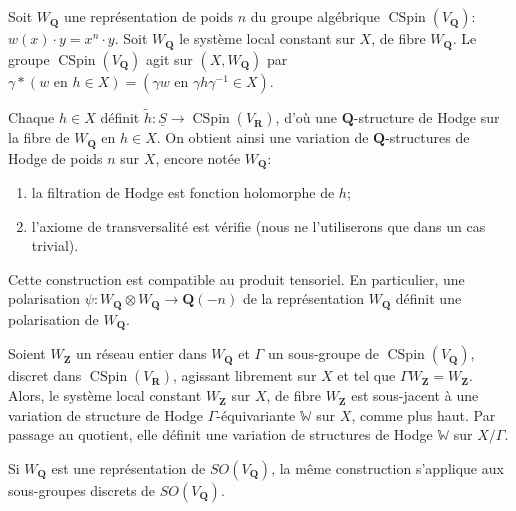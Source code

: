 \documentclass[11pt]{amsart}
\theoremstyle{plain}
\theoremstyle{definition}
\theoremstyle{remark}
\begin{document}
\subsection*{}
Soit $W_\mathbf{Q}$ une repr\'esentation de poids $n$ du groupe alg\'ebrique $\operatorname{CSpin}(V_\mathbf{Q})$: $w(x)\cdot y=x^n\cdot y$. Soit $W_\mathbf{Q}$ le syst\`eme local constant sur $X$, de fibre $W_\mathbf{Q}$. Le groupe $\operatorname{CSpin}(V_\mathbf{Q})$ agit sur $(X,W_\mathbf{Q})$ par $\gamma*(w\text{ en }h\in X)=(\gamma w\text{ en }\gamma h\gamma^{-1}\in X)$.

Chaque $h\in X$ d\'efinit $\tilde{h}\colon\underline{S}\to\operatorname{CSpin}(V_\mathbf{R})$, d'o\`u une $\mathbf{Q}$-structure de Hodge sur la fibre de $W_\mathbf{Q}$ en $h\in X$. On obtient ainsi une variation de $\mathbf{Q}$-structures de Hodge de poids $n$ sur $X$, encore not\'ee $W_\mathbf{Q}$:
\begin{enumerate}
\item[a)] la filtration de Hodge est fonction holomorphe de $h$;
\item[b)] l'axiome de transversalit\'e est v\'erifie (nous ne l'utiliserons que dans un cas trivial).
\end{enumerate}
Cette construction est compatible au produit tensoriel. En particulier, une polarisation $\psi\colon W_\mathbf{Q}\otimes W_\mathbf{Q}\to\mathbf{Q}(-n)$ de la repr\'esentation $W_\mathbf{Q}$ d\'efinit une polarisation de $W_\mathbf{Q}$.

Soient $W_\mathbf{Z}$ un r\'eseau entier dans $W_\mathbf{Q}$ et $\Gamma$ un sous-groupe de $\operatorname{CSpin}(V_\mathbf{Q})$, discret dans $\operatorname{CSpin}(V_\mathbf{R})$, agissant librement sur $X$ et tel que $\Gamma W_\mathbf{Z}=W_\mathbf{Z}$. Alors, le syst\`eme local constant $W_\mathbf{Z}$ sur $X$, de fibre $W_\mathbf{Z}$ est sous-jacent \`a une variation de structure de Hodge $\Gamma$-\'equivariante $\mathbb{W}$ sur $X$, comme plus haut. Par passage au quotient, elle d\'efinit une variation de structures de Hodge $\mathbb{W}$ sur $X/\Gamma$.

Si $W_\mathbf{Q}$ est une repr\'esentation de $SO(V_\mathbf{Q})$, la m\^eme construction s'applique aux sous-groupes discrets de $SO(V_\mathbf{Q})$.
\end{document}
